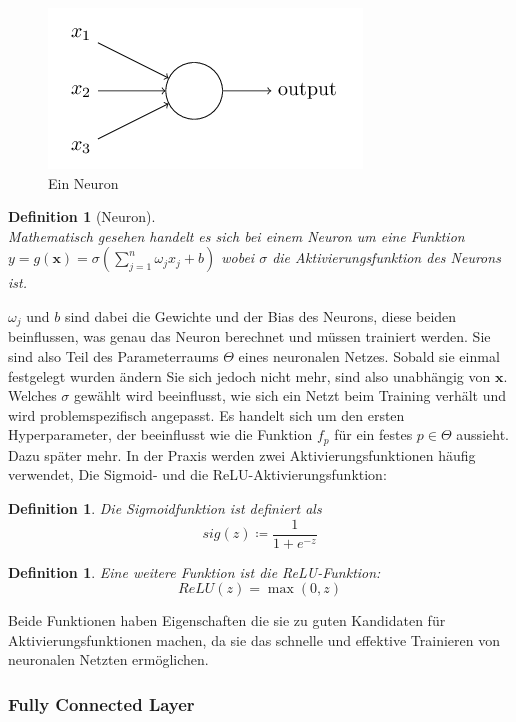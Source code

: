 \documentclass[]{scrartcl}
\newtheorem{defi}[satz]{Definition}
\begin{document}
			\begin{figure}[h]
				\centering
				\includegraphics[scale=0.7]{img/neuron.png}
				\caption{Ein Neuron \cite{textbook}}
				\label{fig:neuron}
			\end{figure}

			\begin{defi}[Neuron] ~\\
				Mathematisch gesehen handelt es sich bei einem Neuron um eine Funktion\\
				$y = g(\mathbf{x}) = \sigma(\sum_{j=1}^n \omega_jx_j + b)$ wobei $\sigma$ die Aktivierungsfunktion des Neurons ist.
			\end{defi}

			$\omega_j$ und $b$ sind dabei die Gewichte und der Bias des Neurons, diese beiden beinflussen, was genau das Neuron berechnet und müssen trainiert werden.
			Sie sind also Teil des Parameterraums $\Theta$ eines neuronalen Netzes.
			Sobald sie einmal festgelegt wurden ändern Sie sich jedoch nicht mehr, sind also unabhängig von $\mathbf{x}$.
			Welches $\sigma$ gewählt wird beeinflusst, wie sich ein Netzt beim Training verhält und wird problemspezifisch angepasst.
			Es handelt sich um den ersten Hyperparameter, der beeinflusst wie die Funktion $f_p$ für ein festes $p \in \Theta$ aussieht. Dazu später mehr.
			In der Praxis werden zwei Aktivierungsfunktionen häufig verwendet, Die Sigmoid- und die ReLU-Aktivierungsfunktion:

			\begin{defi}
				Die Sigmoidfunktion ist definiert als
				$$sig(z) \coloneqq \frac{1}{1+e^{-z}}$$
			\end{defi}
			\begin{defi}
				Eine weitere Funktion ist die ReLU-Funktion:
				$$ReLU(z) = \max(0, z)$$
			\end{defi}

			Beide Funktionen haben Eigenschaften die sie zu guten Kandidaten für Aktivierungsfunktionen machen, da sie das schnelle und effektive Trainieren von neuronalen Netzten ermöglichen.

		\subsubsection{Fully Connected Layer}
\end{document}
